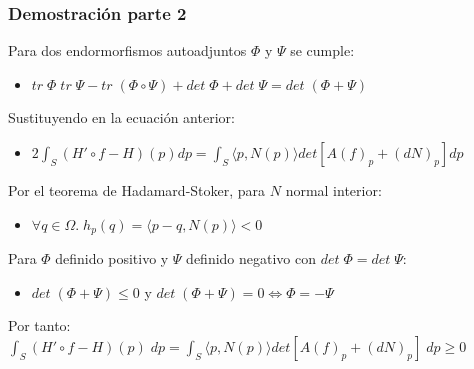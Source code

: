 \documentclass{beamer}
\begin{document}
	\begin{frame}
		\frametitle{Demostración parte 2}
		
		Para dos endormorfismos autoadjuntos $\Phi$ y $\Psi$ se cumple:
		\begin{itemize}
			\item $tr \; \Phi \; tr \; \Psi - tr \; (\Phi \circ \Psi) + det \; \Phi + det \; \Psi = det \; (\Phi + \Psi)$
		\end{itemize}
		
		Sustituyendo en la ecuación anterior:
		\begin{itemize}
			\item $2 \int_S (H' \circ f - H)(p) dp = \int_S \langle p, N(p) \rangle det[A(f)_p + (dN)_p] dp$
		\end{itemize}
		
		Por el teorema de Hadamard-Stoker, para $N$ normal interior:
		\begin{itemize}
			\item $\forall q \in \Omega. \; h_p (q) = \langle p - q, N(p)\rangle < 0$
		\end{itemize}
		Para $\Phi$ definido positivo y $\Psi$ definido negativo con $det \; \Phi = det \; \Psi$:
		\begin{itemize}
			\item $det \; (\Phi + \Psi) \leq 0$ y $det \; (\Phi + \Psi) = 0 \iff \Phi = - \Psi$
		\end{itemize}
		Por tanto:
		$\int_S (H' \circ f - H)(p) \; dp = \int_S \langle p, N(p) \rangle det[A(f)_p + (dN)_p] \; dp \geq 0$
		
	\end{frame}
	
\end{document}
